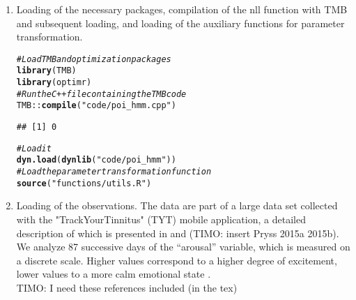 \documentclass[bimj,fleqn]{w-art}\usepackage[]{graphicx}\usepackage[]{color}
\makeatletter
\newcommand{\hlstr}[1]{\textcolor[rgb]{0.192,0.494,0.8}{#1}}%
\newcommand{\hlcom}[1]{\textcolor[rgb]{0.678,0.584,0.686}{\textit{#1}}}%
\newcommand{\hlopt}[1]{\textcolor[rgb]{0,0,0}{#1}}%
\newcommand{\hlstd}[1]{\textcolor[rgb]{0.345,0.345,0.345}{#1}}%
\newcommand{\hlkwd}[1]{\textcolor[rgb]{0.737,0.353,0.396}{\textbf{#1}}}%
\newenvironment{kframe}{%
 \def\at@end@of@kframe{}%
 \ifinner\ifhmode%
  \def\at@end@of@kframe{\end{minipage}}%
  \begin{minipage}{\columnwidth}%
 \fi\fi%
 \def\FrameCommand##1{\hskip\@totalleftmargin \hskip-\fboxsep
 \colorbox{shadecolor}{##1}\hskip-\fboxsep
     \hskip-\linewidth \hskip-\@totalleftmargin \hskip\columnwidth}%
 \MakeFramed {\advance\hsize-\width
   \@totalleftmargin\z@ \linewidth\hsize
   \@setminipage}}%
 {\par\unskip\endMakeFramed%
 \at@end@of@kframe}
\newenvironment{knitrout}{}{} %
\theoremstyle{plain}
\theoremstyle{definition}
\makeatother
\begin{document}
\begin{enumerate}
\item Loading of the necessary packages, compilation of the nll function with TMB and subsequent loading, and loading of the auxiliary functions for parameter transformation.
\begin{knitrout}
\color{fgcolor}\begin{kframe}
\begin{alltt}
\hlcom{# Load TMB and optimization packages}
\hlkwd{library}\hlstd{(TMB)}
\hlkwd{library}\hlstd{(optimr)}
\hlcom{# Run the C++ file containing the TMB code}
\hlstd{TMB}\hlopt{::}\hlkwd{compile}\hlstd{(}\hlstr{"code/poi_hmm.cpp"}\hlstd{)}
\end{alltt}
\begin{verbatim}
## [1] 0
\end{verbatim}
\begin{alltt}
\hlcom{# Load it}
\hlkwd{dyn.load}\hlstd{(}\hlkwd{dynlib}\hlstd{(}\hlstr{"code/poi_hmm"}\hlstd{))}
\hlcom{# Load the parameter transformation function}
\hlkwd{source}\hlstd{(}\hlstr{"functions/utils.R"}\hlstd{)}
\end{alltt}
\end{kframe}
\end{knitrout}

\item Loading of the observations. The data are part of a large data set collected with the "TrackYourTinnitus" (TYT) mobile application, a detailed description of which is presented in \citet{pryss} and \citet{pryssa}(TIMO: insert Pryss 2015a  2015b).
We analyze 87 successive days of the ``arousal'' variable, which is measured on a discrete scale. Higher values correspond to a higher degree of excitement, lower values to a more calm emotional state \citep[for details, see][]{probst}.\\

TIMO: I need these references included (in the tex)




\end{enumerate}
\end{document}
